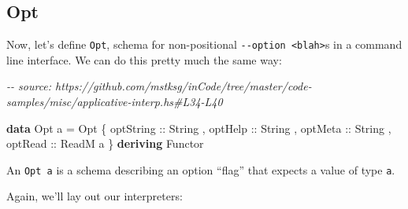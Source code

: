 \documentclass[]{article}
\newenvironment{Shaded}{}{}
\newcommand{\CommentTok}[1]{\textcolor[rgb]{0.38,0.63,0.69}{\textit{#1}}}
\newcommand{\DataTypeTok}[1]{\textcolor[rgb]{0.56,0.13,0.00}{#1}}
\newcommand{\KeywordTok}[1]{\textcolor[rgb]{0.00,0.44,0.13}{\textbf{#1}}}
\newcommand{\NormalTok}[1]{#1}
\newcommand{\OperatorTok}[1]{\textcolor[rgb]{0.40,0.40,0.40}{#1}}
\newcommand{\OtherTok}[1]{\textcolor[rgb]{0.00,0.44,0.13}{#1}}
\newcommand{\StringTok}[1]{\textcolor[rgb]{0.25,0.44,0.63}{#1}}
\begin{document}
\subsection{Opt}\label{opt}

Now, let's define \texttt{Opt}, schema for non-positional
\texttt{-\/-option\ \textless{}blah\textgreater{}}s in a command line interface.
We can do this pretty much the same way:

\begin{Shaded}
\begin{Highlighting}[]
\CommentTok{{-}{-} source: https://github.com/mstksg/inCode/tree/master/code{-}samples/misc/applicative{-}interp.hs\#L34{-}L40}

\KeywordTok{data} \DataTypeTok{Opt}\NormalTok{ a }\OtherTok{=} \DataTypeTok{Opt}
\NormalTok{    \{}\OtherTok{ optString ::} \DataTypeTok{String}
\NormalTok{    ,}\OtherTok{ optHelp   ::} \DataTypeTok{String}
\NormalTok{    ,}\OtherTok{ optMeta   ::} \DataTypeTok{String}
\NormalTok{    ,}\OtherTok{ optRead   ::} \DataTypeTok{ReadM}\NormalTok{ a}
\NormalTok{    \}}
  \KeywordTok{deriving} \DataTypeTok{Functor}
\end{Highlighting}
\end{Shaded}

An \texttt{Opt\ a} is a schema describing an option ``flag'' that expects a
value of type \texttt{a}.

Again, we'll lay out our interpreters:

\begin{Shaded}
\end{Shaded}
\end{document}
